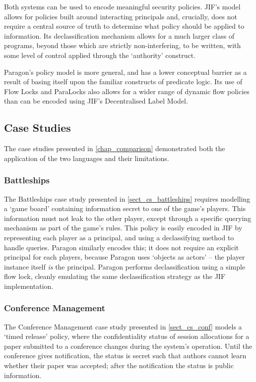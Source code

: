 Both systems can be used to encode meaningful security policies. JIF's model allows for policies built around interacting principals and, crucially, does not require a central source of truth to determine what policy should be applied to information. Its declassification mechanism allows for a much larger class of programs, beyond those which are strictly non-interfering, to be written, with some level of control applied through the `authority' construct. 

Paragon's policy model is more general, and has a lower conceptual barrier as a result of basing itself upon the familiar constructs of predicate logic. Its use of Flow Locks and ParaLocks also allows for a wider range of dynamic flow policies than can be encoded using JIF's Decentralised Label Model.

\subsection{Case Studies}

The case studies presented in \autoref{chap_comparison} demonstrated both the application of the two languages and their limitations.

\subsubsection{Battleships}

The Battleships case study presented in \ref{sect_cs_battleships} requires modelling a `game board' containing information secret to one of the game's players. This information must not leak to the other player, except through a specific querying mechanism as part of the game's rules. This policy is easily encoded in JIF by representing each player as a principal, and using a declassifying method to handle queries. Paragon similarly encodes this; it does not require an explicit principal for each players, because Paragon uses `objects as actors' -- the player instance itself \textit{is} the principal. Paragon performs declassification using a simple flow lock, cleanly emulating the same declassification strategy as the JIF implementation.

\subsubsection{Conference Management}

The Conference Management case study presented in \ref{sect_cs_conf} models a `timed release' policy, where the confidentiality status of session allocations for a paper submitted to a conference changes during the system's operation. Until the conference gives notification, the status is secret such that authors cannot learn whether their paper was accepted; after the notification the status is public information.

